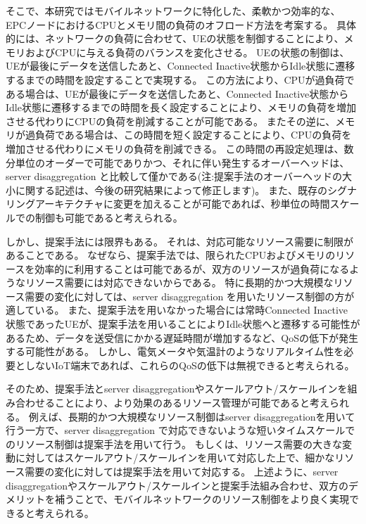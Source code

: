 \documentclass[a4j]{ujarticle}
\begin{document}
そこで、本研究ではモバイルネットワークに特化した、柔軟かつ効率的な、EPCノードにおけるCPUとメモリ間の負荷のオフロード方法を考案する。
具体的には、ネットワークの負荷に合わせて、UEの状態を制御することにより、メモリおよびCPUに与える負荷のバランスを変化させる。
UEの状態の制御は、UEが最後にデータを送信したあと、Connected Inactive状態からIdle状態に遷移するまでの時間を設定することで実現する。
この方法により、CPUが過負荷である場合は、UEが最後にデータを送信したあと、Connected Inactive状態からIdle状態に遷移するまでの時間を長く設定することにより、メモリの負荷を増加させる代わりにCPUの負荷を削減することが可能である。
またその逆に、メモリが過負荷である場合は、この時間を短く設定することにより、CPUの負荷を増加させる代わりにメモリの負荷を削減できる。
この時間の再設定処理は、数分単位のオーダーで可能でありかつ、それに伴い発生するオーバーヘッドは、server disaggregation と比較して僅かである(注:提案手法のオーバーヘッドの大小に関する記述は、今後の研究結果によって修正します)。
また、既存のシグナリングアーキテクチャに変更を加えることが可能であれば、秒単位の時間スケールでの制御も可能であると考えられる。

しかし、提案手法には限界もある。
それは、対応可能なリソース需要に制限があることである。
なぜなら、提案手法では、限られたCPUおよびメモリのリソースを効率的に利用することは可能であるが、双方のリソースが過負荷になるようなリソース需要には対応できないからである。
特に長期的かつ大規模なリソース需要の変化に対しては、server disaggregation を用いたリソース制御の方が適している。
また、提案手法を用いなかった場合には常時Connected Inactive 状態であったUEが、提案手法を用いることによりIdle状態へと遷移する可能性があるため、データを送受信にかかる遅延時間が増加するなど、QoSの低下が発生する可能性がある。
しかし、電気メータや気温計のようなリアルタイム性を必要としないIoT端末であれば、これらのQoSの低下は無視できると考えられる。

そのため、提案手法とserver disaggregationやスケールアウト/スケールインを組み合わせることにより、より効果のあるリソース管理が可能であると考えられる。
例えば、長期的かつ大規模なリソース制御はserver disaggregationを用いて行う一方で、server disaggregation で対応できないような短いタイムスケールでのリソース制御は提案手法を用いて行う。
もしくは、リソース需要の大きな変動に対してはスケールアウト/スケールインを用いて対応した上で、細かなリソース需要の変化に対しては提案手法を用いて対応する。
上述ように、server disaggregationやスケールアウト/スケールインと提案手法組み合わせ、双方のデメリットを補うことで、モバイルネットワークのリソース制御をより良く実現できると考えられる。
\end{document}
